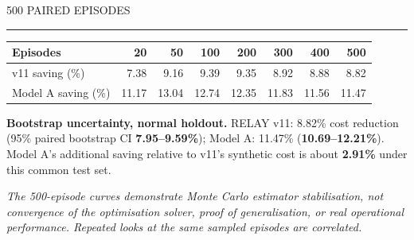 \documentclass[10pt,a4paper]{article}
\newcommand{\sect}[2]{\vspace{4mm}{\Large\sffamily\bfseries #1}\hfill{\small\sffamily\color{muted}#2}\par\vspace{1mm}\color{sage}\rule{\linewidth}{1.0pt}\color{ink}\vspace{2mm}}
\newcommand{\methodnote}[1]{{\footnotesize\color{muted}\textit{#1}}\par}
\begin{document}
\sect{06 / Statistical convergence}{500 PAIRED EPISODES}
\par\vspace{2mm}
\begin{tabularx}{\linewidth}{@{}lrrrrrrr@{}}
\toprule
Episodes & 20 & 50 & 100 & 200 & 300 & 400 & 500\\\midrule
v11 saving (\%) & 7.38 & 9.16 & 9.39 & 9.35 & 8.92 & 8.88 & 8.82\\
Model A saving (\%) & 11.17 & 13.04 & 12.74 & 12.35 & 11.83 & 11.56 & 11.47\\
\bottomrule
\end{tabularx}
\begin{insight}
\textbf{Bootstrap uncertainty, normal holdout.} RELAY v11: 8.82\% cost reduction (95\% paired bootstrap CI \textbf{7.95--9.59\%}); Model A: 11.47\% (\textbf{10.69--12.21\%}). Model A's additional saving relative to v11's synthetic cost is about \textbf{2.91\%} under this common test set.
\end{insight}
\methodnote{The 500-episode curves demonstrate Monte Carlo estimator stabilisation, not convergence of the optimisation solver, proof of generalisation, or real operational performance. Repeated looks at the same sampled episodes are correlated.}
\newpage
\end{document}
